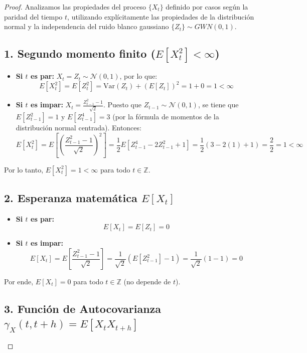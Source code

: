 \documentclass[11pt,letterpaper]{article}
\begin{document}
\begin{proof}
Analizamos las propiedades del proceso $\{X_t\}$ definido por casos según la paridad del tiempo $t$, utilizando explícitamente las propiedades de la distribución normal y la independencia del ruido blanco gaussiano $\{Z_t\} \sim GWN(0,1)$.

\subsection*{1. Segundo momento finito ($E[X_t^2] < \infty$)}

\begin{itemize}
    \item \textbf{Si $t$ es par:} $X_t = Z_t \sim \mathcal{N}(0,1)$, por lo que:
    \[
    E[X_t^2] = E[Z_t^2] = \text{Var}(Z_t) + (E[Z_t])^2 = 1 + 0 = 1 < \infty
    \]

    \item \textbf{Si $t$ es impar:} $X_t = \frac{Z_{t-1}^2 - 1}{\sqrt{2}}$. Puesto que $Z_{t-1} \sim \mathcal{N}(0,1)$, se tiene que $E[Z_{t-1}^2] = 1$ y $E[Z_{t-1}^4] = 3$ (por la fórmula de momentos de la distribución normal centrada). Entonces:
    \[
    E[X_t^2] = E\left[\left(\frac{Z_{t-1}^2 - 1}{\sqrt{2}}\right)^2\right] = \frac{1}{2} E\left[Z_{t-1}^4 - 2Z_{t-1}^2 + 1\right] = \frac{1}{2} \left( 3 - 2(1) + 1 \right) = \frac{2}{2} = 1 < \infty
    \]
\end{itemize}
Por lo tanto, $E[X_t^2] = 1 < \infty$ para todo $t \in \mathbb{Z}$.

\subsection*{2. Esperanza matemática $E[X_t]$}

\begin{itemize}
    \item \textbf{Si $t$ es par:} 
    \[
    E[X_t] = E[Z_t] = 0
    \]

    \item \textbf{Si $t$ es impar:} 
    \[
    E[X_t] = E\left[\frac{Z_{t-1}^2 - 1}{\sqrt{2}}\right] = \frac{1}{\sqrt{2}} \left( E[Z_{t-1}^2] - 1 \right) = \frac{1}{\sqrt{2}}(1 - 1) = 0
    \]
\end{itemize}
Por ende, $E[X_t] = 0$ para todo $t \in \mathbb{Z}$ (no depende de $t$).

\subsection*{3. Función de Autocovarianza $\gamma_X(t, t+h) = E[X_t X_{t+h}]$}


\end{proof}
\end{document}
